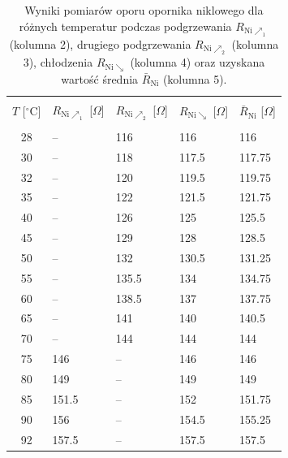 \documentclass[twocolumn, a4paper, polish, 10pt]{article}
\begin{document}
\begin{table}[ht]
\begin{center}
\renewcommand*{\tablename}{Tabela}
\caption{\small
Wyniki pomiarów oporu opornika niklowego dla różnych temperatur podczas podgrzewania $R_{\mathrm{Ni \nearrow_1}}$ (kolumna 2), drugiego podgrzewania $R_{\mathrm{Ni \nearrow_2}}$ (kolumna 3), chłodzenia $R_{\mathrm{Ni \searrow}}$ (kolumna 4) oraz uzyskana wartość średnia $\bar{R}_{\mathrm{Ni}}$ (kolumna 5).
\vspace{0.15cm}
    \label{tab:opornik-niklowy-pomiary}}
    {\small
    \begin{tabular}{c l l l l}
    \hline \vspace{-0.35cm} \\
      $T$ [$^{\circ}$C] & $R_{\mathrm{Ni\nearrow_1}}$ [$\Omega$] & $R_{\mathrm{Ni\nearrow_2}}$ [$\Omega$] & $R_{\mathrm{Ni\searrow}}$ [$\Omega$] & $\bar{R}_{\mathrm{Ni}}$ [$\Omega$] \\
      \hline \vspace{-0.2cm} \\
        28 & --    & 116   & 116   & 116    \\
        30 & --    & 118   & 117.5 & 117.75 \\
        32 & --    & 120   & 119.5 & 119.75 \\
        35 & --    & 122   & 121.5 & 121.75 \\
        40 & --    & 126   & 125   & 125.5  \\
        45 & --    & 129   & 128   & 128.5  \\
        50 & --    & 132   & 130.5 & 131.25 \\
        55 & --    & 135.5 & 134   & 134.75 \\
        60 & --    & 138.5 & 137   & 137.75 \\
        65 & --    & 141   & 140   & 140.5  \\
        70 & --    & 144   & 144   & 144    \\
        75 & 146   & --    & 146   & 146    \\
        80 & 149   & --    & 149   & 149    \\
        85 & 151.5 & --    & 152   & 151.75 \\
        90 & 156   & --    & 154.5 & 155.25 \\
        92 & 157.5 & --    & 157.5 & 157.5  \\
    \hline
    \end{tabular}}
    \end{center}
\end{table}
\end{document}
